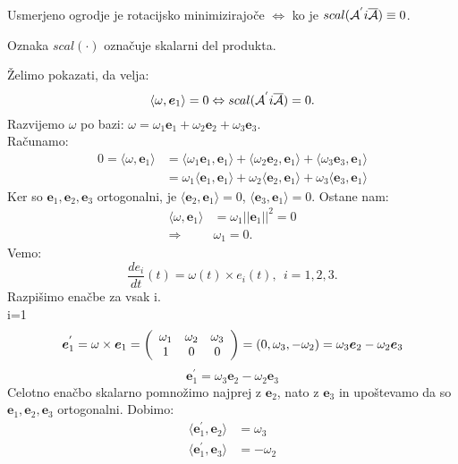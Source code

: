 \documentclass[mat1]{fmfdelo}
\newcommand{\e}{\boldsymbol e}
\newcommand{\A}{\mathcal A}
\begin{document}
\begin{trditev}
	Usmerjeno ogrodje je rotacijsko minimizirajoče $\Leftrightarrow$ ko je $scal(\A^{'} \\i\overline{\A})\equiv0$.
\end{trditev}
\begin{opomba}
	Oznaka $scal(\cdot)$ označuje skalarni del produkta.
\end{opomba}
\begin{dokaz}
Želimo pokazati, da velja:
\begin{equation}
\langle \omega,\e_1\rangle = 0 \Leftrightarrow scal(\A^{'} \\i\overline{\A}) = 0.
\end{equation}
Razvijemo $\omega$ po bazi: $\omega = \omega_1\e_1+\omega_2\e_2+\omega_3\e_3$. \\
Računamo:
\begin{equation*}
\begin{split}
0 = \langle \omega, \e_1 \rangle &= \langle \omega_1\e_1,\e_1\rangle + \langle \omega_2\e_2,\e_1\rangle + \langle \omega_3\e_3,\e_1\rangle \\
&= \omega_1\langle \e_1,\e_1\rangle + \omega_2\langle \e_2,\e_1\rangle + \omega_3\langle \e_3,\e_1\rangle
\end{split}
\end{equation*}
Ker so $\e_1,\e_2,\e_3$ ortogonalni, je  $\langle \e_2,\e_1\rangle = 0$, $\langle \e_3,\e_1\rangle=0$.
Ostane nam:
\begin{equation*}
\begin{split}
\langle \omega,\e_1 \rangle &=\omega_1 || \e_1 ||^2 = 0 \\
\Rightarrow ~~ & \omega_1 = 0.
\end{split}
\end{equation*}
Vemo:
\begin{equation*}
\frac{de_i}{dt}(t) = \omega(t) \times e_i(t), ~~ i=1,2,3.
\end{equation*}
Razpišimo enačbe za vsak i.\\
i=1
\begin{equation*}
\e_1^{'} = \omega \times \e_1 = \left(
\begin{array}{c c c}
\omega_1 & \omega_2 & \omega_3 \\
1 & 0 & 0
\end{array} \right)
= (0, \omega_3,-\omega_2) = \omega_3\e_2 - \omega_2\e_3
\end{equation*}
\begin{equation*}
\e_1^{'} = \omega_3\e_2-\omega_2\e_3
\end{equation*}
Celotno enačbo skalarno pomnožimo najprej z $\e_2$, nato z $\e_3$ in upoštevamo da so $\e_1,\e_2,\e_3$ ortogonalni. Dobimo:
\begin{equation*}
\begin{split}
\langle \e_1^{'}, \e_2 \rangle & = \omega_3 \\
\langle \e_1^{'}, \e_3 \rangle &= -\omega_2
\end{split}
\end{equation*}


\end{dokaz}
\end{document}
